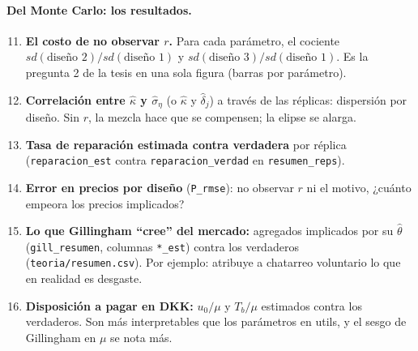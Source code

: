 \documentclass[11pt]{article}
\newcommand{\col}[1]{\texttt{#1}}
\begin{document}
\paragraph{Del Monte Carlo: los resultados.}
\begin{enumerate}
  \setcounter{enumi}{10}
  \item \textbf{El costo de no observar $r$.} Para cada parámetro, el cociente
  $sd(\text{diseño }2)/sd(\text{diseño }1)$ y $sd(\text{diseño }3)/sd(\text{diseño }1)$.
  Es la pregunta 2 de la tesis en una sola figura (barras por parámetro).
  \item \textbf{Correlación entre $\hat\kappa$ y $\hat\sigma_\eta$} (o $\hat\kappa$ y
  $\hat\delta_j$) a través de las réplicas: dispersión por diseño. Sin $r$, la mezcla hace que
  se compensen; la elipse se alarga.
  \item \textbf{Tasa de reparación estimada contra verdadera} por réplica
  (\col{reparacion\_est} contra \col{reparacion\_verdad} en \texttt{resumen\_reps}).
  \item \textbf{Error en precios por diseño} (\col{P\_rmse}): no observar $r$ ni el motivo,
  ¿cuánto empeora los precios implicados?
  \item \textbf{Lo que Gillingham ``cree'' del mercado:} agregados implicados por su
  $\hat\theta$ (\texttt{gill\_resumen}, columnas \col{*\_est}) contra los verdaderos
  (\texttt{teoria/resumen.csv}). Por ejemplo: atribuye a chatarreo voluntario lo que en
  realidad es desgaste.
  \item \textbf{Disposición a pagar en DKK:} $u_0/\mu$ y $T_b/\mu$ estimados contra los
  verdaderos. Son más interpretables que los parámetros en utils, y el sesgo de Gillingham en
  $\mu$ se nota más.
\end{enumerate}
\end{document}
